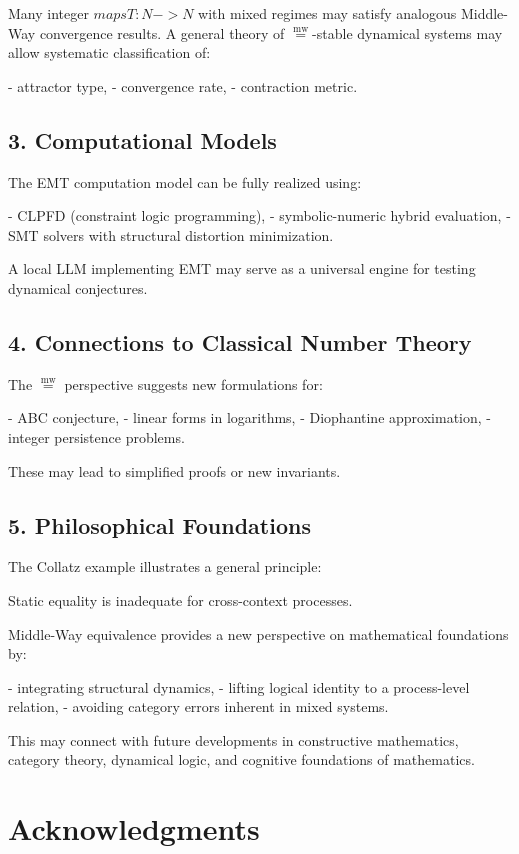 \documentclass[11pt]{article}
\newcommand{\mweq}{\mathrel{\overset{\mathrm{mw}}{=}}}
\theoremstyle{definition}
\theoremstyle{remark}
\begin{document}
Many integer $maps T: N -> N$ with mixed regimes may satisfy analogous
Middle-Way convergence results.  
A general theory of $\mweq$-stable dynamical systems may allow systematic
classification of:

- attractor type,
- convergence rate,
- contraction metric.

\subsection{3. Computational Models}

The EMT computation model can be fully realized using:

- CLPFD (constraint logic programming),
- symbolic-numeric hybrid evaluation,
- SMT solvers with structural distortion minimization.

A local LLM implementing EMT may serve as a universal engine for
testing dynamical conjectures.

\subsection{4. Connections to Classical Number Theory}

The $\mweq$ perspective suggests new formulations for:

- ABC conjecture,
- linear forms in logarithms,
- Diophantine approximation,
- integer persistence problems.

These may lead to simplified proofs or new invariants.

\subsection{5. Philosophical Foundations}

The Collatz example illustrates a general principle:

Static equality is inadequate for cross-context processes.

Middle-Way equivalence provides a new perspective on mathematical
foundations by:

- integrating structural dynamics,
- lifting logical identity to a process-level relation,
- avoiding category errors inherent in mixed systems.

This may connect with future developments in constructive mathematics,
category theory, dynamical logic, and cognitive foundations of
mathematics.

\section{Acknowledgments}
\end{document}
